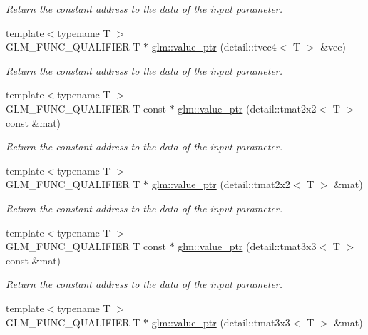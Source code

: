 \begin{DoxyCompactItemize}
\begin{DoxyCompactList}\small\item\em Return the constant address to the data of the input parameter. \end{DoxyCompactList}\item 
{\footnotesize template$<$typename T $>$ }\\G\-L\-M\-\_\-\-F\-U\-N\-C\-\_\-\-Q\-U\-A\-L\-I\-F\-I\-E\-R T $\ast$ \hyperlink{group__gtc__type__ptr_ga63ee2093cab935f4471fdc55484aeb63}{glm\-::value\-\_\-ptr} (detail\-::tvec4$<$ T $>$ \&vec)
\begin{DoxyCompactList}\small\item\em Return the constant address to the data of the input parameter. \end{DoxyCompactList}\item 
{\footnotesize template$<$typename T $>$ }\\G\-L\-M\-\_\-\-F\-U\-N\-C\-\_\-\-Q\-U\-A\-L\-I\-F\-I\-E\-R T const $\ast$ \hyperlink{group__gtc__type__ptr_gabc0ecc372916bebbd130341cb0799376}{glm\-::value\-\_\-ptr} (detail\-::tmat2x2$<$ T $>$ const \&mat)
\begin{DoxyCompactList}\small\item\em Return the constant address to the data of the input parameter. \end{DoxyCompactList}\item 
{\footnotesize template$<$typename T $>$ }\\G\-L\-M\-\_\-\-F\-U\-N\-C\-\_\-\-Q\-U\-A\-L\-I\-F\-I\-E\-R T $\ast$ \hyperlink{group__gtc__type__ptr_ga09141ef8c41ab15f7989b620e748ae3c}{glm\-::value\-\_\-ptr} (detail\-::tmat2x2$<$ T $>$ \&mat)
\begin{DoxyCompactList}\small\item\em Return the constant address to the data of the input parameter. \end{DoxyCompactList}\item 
{\footnotesize template$<$typename T $>$ }\\G\-L\-M\-\_\-\-F\-U\-N\-C\-\_\-\-Q\-U\-A\-L\-I\-F\-I\-E\-R T const $\ast$ \hyperlink{group__gtc__type__ptr_ga23b2a53a00923f747637fc271f78e9db}{glm\-::value\-\_\-ptr} (detail\-::tmat3x3$<$ T $>$ const \&mat)
\begin{DoxyCompactList}\small\item\em Return the constant address to the data of the input parameter. \end{DoxyCompactList}\item 
{\footnotesize template$<$typename T $>$ }\\G\-L\-M\-\_\-\-F\-U\-N\-C\-\_\-\-Q\-U\-A\-L\-I\-F\-I\-E\-R T $\ast$ \hyperlink{group__gtc__type__ptr_ga2cadd2b9a774d77c66e8f723b729c4e7}{glm\-::value\-\_\-ptr} (detail\-::tmat3x3$<$ T $>$ \&mat)

\end{DoxyCompactItemize}
